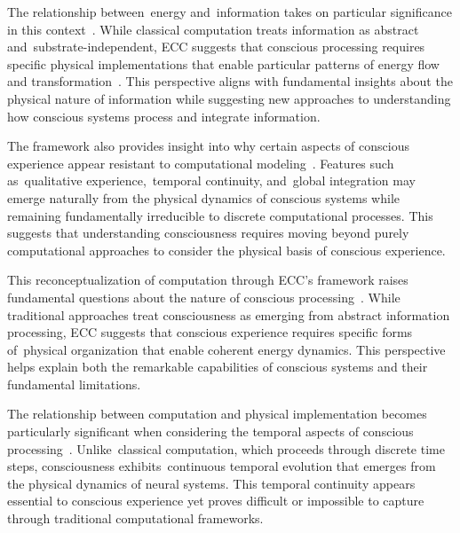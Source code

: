 The relationship between~energy and~information takes on particular significance in this context~\cite{attwell2001}. While classical computation treats information as abstract and~substrate-independent, ECC suggests that conscious processing requires specific physical implementations that enable particular patterns of energy flow and transformation~\cite{laughlin2001}. This perspective aligns with fundamental insights about the physical nature of information while suggesting new approaches to understanding how conscious systems process and integrate information.

The framework also provides insight into why certain aspects of conscious experience appear resistant to computational modeling~\cite{demetrius2015}. Features such as~qualitative experience,~temporal continuity, and~global integration may emerge naturally from the physical dynamics of conscious systems while remaining fundamentally irreducible to discrete computational processes. This suggests that understanding consciousness requires moving beyond purely computational approaches to consider the physical basis of conscious experience.

This reconceptualization of computation through ECC's framework raises fundamental questions about the nature of conscious processing~\cite{pinotsis2023cytoelectric}. While traditional approaches treat consciousness as emerging from abstract information processing, ECC suggests that conscious experience requires specific forms of~physical organization that enable coherent energy dynamics. This perspective helps explain both the remarkable capabilities of conscious systems and their fundamental limitations.

The relationship between computation and physical implementation becomes particularly significant when considering the temporal aspects of conscious processing~\cite{hunt2024electromagnetic}. Unlike~classical computation, which proceeds through discrete time steps, consciousness exhibits~continuous temporal evolution that emerges from the physical dynamics of neural systems. This temporal continuity appears essential to conscious experience yet proves difficult or impossible to capture through traditional computational frameworks.

